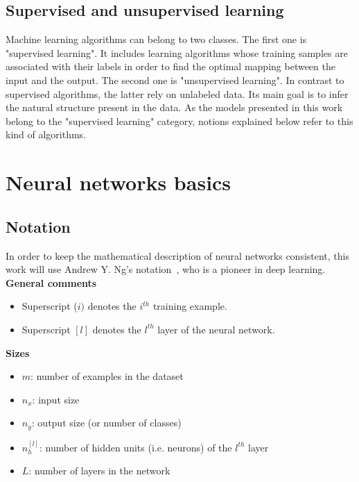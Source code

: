 \subsection{Supervised and unsupervised learning}

\setlength{\marginparwidth}{3cm}\leavevmode {}Machine learning algorithms can belong to two classes. The first one is "supervised learning". It includes learning algorithms whose training samples are associated with their labels in order to find the optimal mapping between the input and the output. The second one is "unsupervised learning". In contrast to supervised algorithms, the latter rely on unlabeled data. Its main goal is to infer the natural structure  present in the data. As the models presented in this work belong to the "supervised learning" category, notions explained below refer to this kind of algorithms.


\section{Neural networks basics}

\subsection{Notation}

\setlength{\marginparwidth}{3cm}\leavevmode {}In order to keep the mathematical description of neural networks consistent, this work will use Andrew Y. Ng's notation~\cite{16}, who is a pioneer in deep learning.\\

\noindent \textbf{General comments}
\begin{itemize}
\item Superscript ($i)$ denotes the $i^{th}$ training example.
\item Superscript $[l]$ denotes the $l^{th}$ layer of the neural network.
\end{itemize}

\noindent \textbf{Sizes}
\begin{itemize}
\item $m$: number of examples in the dataset
\item $n_{x}$: input size
\item $n_{y}$: output size (or number of classes)
\item $n_{h}^{[l]}$: number of hidden units (i.e. neurons) of the $l^{th}$ layer
\item $L$: number of layers in the network
\end{itemize}

